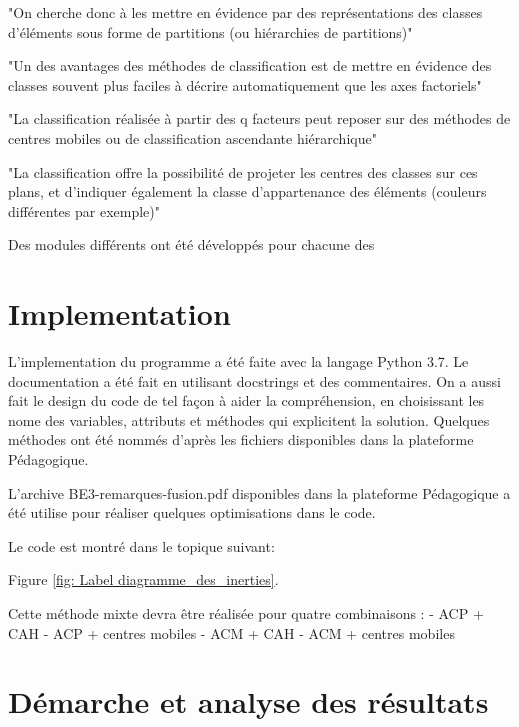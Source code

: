 \documentclass{rapportECL}
\begin{document}
"On cherche donc à les mettre en évidence
par des représentations des classes
d’éléments sous forme de partitions (ou
hiérarchies de partitions)" %

"Un des avantages des méthodes de
classification est de mettre en évidence des
classes souvent plus faciles à décrire
automatiquement que les axes factoriels" %

"La classification réalisée à partir des q facteurs
peut reposer sur des méthodes de centres
mobiles ou de classification ascendante
hiérarchique" %

"La classification offre la possibilité de projeter les centres des 
classes sur ces plans, et d’indiquer également la classe
d’appartenance des éléments (couleurs différentes par exemple)"%


Des modules différents ont été développés pour chacune des 

\section{Implementation}

L'implementation du programme a été faite avec la langage Python 3.7. Le documentation a été fait en utilisant docstrings et des commentaires. On a aussi fait le design du code de tel façon  à aider la compréhension, en choisissant les nome des variables, attributs et méthodes qui explicitent la solution. Quelques méthodes ont été nommés d'après les fichiers disponibles dans la plateforme Pédagogique.

L'archive BE3-remarques-fusion.pdf disponibles dans la plateforme Pédagogique a été utilise pour réaliser quelques optimisations dans le code.

Le code est montré dans le topique suivant:

Figure \ref{fig: Label diagramme_des_inerties}.


Cette méthode mixte devra être réalisée pour quatre combinaisons :
- ACP + CAH
- ACP + centres mobiles
- ACM + CAH
- ACM + centres mobiles



\section{Démarche et analyse des résultats}
\end{document}
